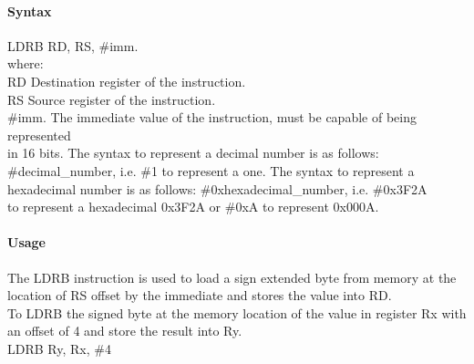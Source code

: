 \documentclass[12pt]{article}
\begin{document}
    \paragraph{Syntax}
    \begin{flushleft}
    LDRB RD, RS, \#imm.\\
    \vspace{1em}        %
    where:\\
    \vspace{1em}
    RD  \hspace{3.6em} Destination register of the instruction.\\
    \vspace{1em}
    RS  \hspace{3.85em} Source register of the instruction.\\
    \vspace{1em}
    \#imm.  \hspace{1.8em} The immediate value of the instruction, must be capable of being represented\\             \hspace{5.4em} in 16 bits. The syntax to represent a decimal number is as follows:\\
            \hspace{5.4em} \#decimal\_number, i.e. \#1 to represent a one. The syntax to represent a\\
            \hspace{5.4em} hexadecimal number is as follows: \#0xhexadecimal\_number, i.e. \#0x3F2A \\
            \hspace{5.4em} to represent a hexadecimal 0x3F2A or \#0xA to represent 0x000A.\\
    \end{flushleft}
    
    \paragraph{Usage}
    \begin{flushleft}
    The LDRB instruction is used to load a sign extended byte from memory at the location of RS offset by the immediate and stores the value into RD.\\    
    \vspace{1em}
    To LDRB the signed byte at the memory location of the value in register Rx with an offset of 4 and store the result into Ry.\\
    \vspace{1em}
    LDRB Ry, Rx, \#4
    \end{flushleft}
    
\end{document}

